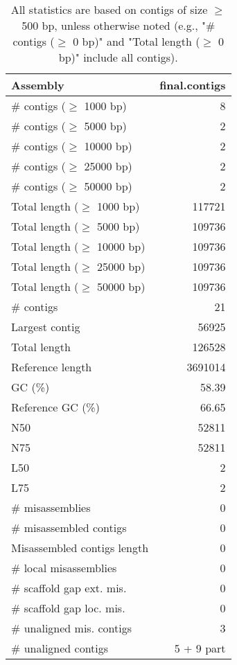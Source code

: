 \documentclass[12pt,a4paper]{article}
\begin{document}
\begin{table}[ht]
\begin{center}
\caption{All statistics are based on contigs of size $\geq$ 500 bp, unless otherwise noted (e.g., "\# contigs ($\geq$ 0 bp)" and "Total length ($\geq$ 0 bp)" include all contigs).}
\begin{tabular}{|l*{1}{|r}|}
\hline
Assembly & final.contigs \\ \hline
\# contigs ($\geq$ 1000 bp) & 8 \\ \hline
\# contigs ($\geq$ 5000 bp) & 2 \\ \hline
\# contigs ($\geq$ 10000 bp) & 2 \\ \hline
\# contigs ($\geq$ 25000 bp) & 2 \\ \hline
\# contigs ($\geq$ 50000 bp) & 2 \\ \hline
Total length ($\geq$ 1000 bp) & 117721 \\ \hline
Total length ($\geq$ 5000 bp) & 109736 \\ \hline
Total length ($\geq$ 10000 bp) & 109736 \\ \hline
Total length ($\geq$ 25000 bp) & 109736 \\ \hline
Total length ($\geq$ 50000 bp) & 109736 \\ \hline
\# contigs & 21 \\ \hline
Largest contig & 56925 \\ \hline
Total length & 126528 \\ \hline
Reference length & 3691014 \\ \hline
GC (\%) & 58.39 \\ \hline
Reference GC (\%) & 66.65 \\ \hline
N50 & 52811 \\ \hline
N75 & 52811 \\ \hline
L50 & 2 \\ \hline
L75 & 2 \\ \hline
\# misassemblies & 0 \\ \hline
\# misassembled contigs & 0 \\ \hline
Misassembled contigs length & 0 \\ \hline
\# local misassemblies & 0 \\ \hline
\# scaffold gap ext. mis. & 0 \\ \hline
\# scaffold gap loc. mis. & 0 \\ \hline
\# unaligned mis. contigs & 3 \\ \hline
\# unaligned contigs & 5 + 9 part \\ \hline

\end{tabular}
\end{center}
\end{table}
\end{document}
